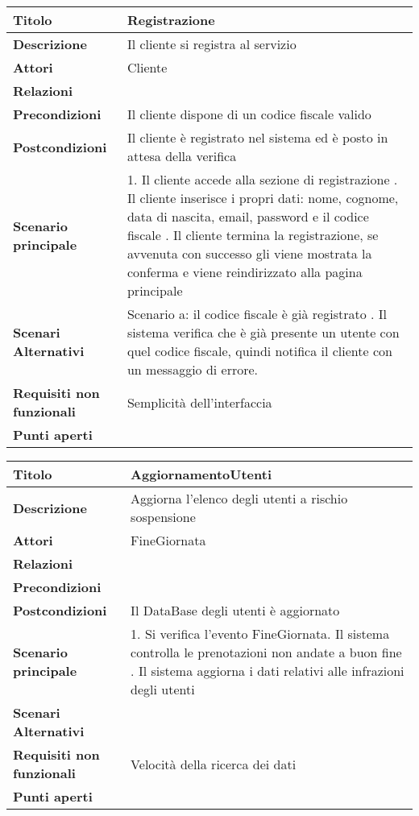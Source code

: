 \begin{tabular} {|P{4.5cm}|P{12.5cm}|}
  \hline
    \textbf{Titolo} & Registrazione\\
  \hline
    \textbf{Descrizione} & Il cliente si registra al servizio\\
  \hline
    \textbf{Attori} & Cliente\\
  \hline
    \textbf{Relazioni} &\\
  \hline
  \textbf{Precondizioni} & Il cliente dispone di un codice fiscale valido\\
  \hline
    \textbf{Postcondizioni} & Il cliente è registrato nel sistema ed è posto in attesa della verifica\\
  \hline
    \textbf{Scenario principale} & 1. Il cliente accede alla sezione di
    registrazione . Il cliente inserisce i propri dati: nome,
    cognome, data di nascita, email, password e il codice fiscale . Il
    cliente termina la registrazione, se avvenuta con successo gli viene
    mostrata la conferma e viene reindirizzato alla pagina principale\\
  \hline
    \textbf{Scenari Alternativi} & Scenario a: il codice fiscale è già
    registrato . Il sistema verifica che è già presente un utente
    con quel codice fiscale, quindi notifica il cliente con un messaggio di
    errore.\\
  \hline
    \textbf{Requisiti non funzionali} & Semplicità dell'interfaccia\\
  \hline
    \textbf{Punti aperti} &\\
  \hline
\end{tabular}
\hfill
\break

\begin{tabular} {|P{4.5cm}|P{12.5cm}|}
\hline
  \textbf{Titolo} & AggiornamentoUtenti\\
\hline
  \textbf{Descrizione} & Aggiorna l'elenco degli utenti a rischio sospensione\\
\hline
  \textbf{Attori} & FineGiornata\\
\hline
  \textbf{Relazioni} &\\
\hline
  \textbf{Precondizioni} &\\
\hline
  \textbf{Postcondizioni} & Il DataBase degli utenti è aggiornato\\
\hline
  \textbf{Scenario principale} & 1. Si verifica l'evento FineGiornata. Il sistema controlla le prenotazioni non andate a buon fine . Il
  sistema aggiorna i dati relativi alle infrazioni degli utenti\\
\hline
  \textbf{Scenari Alternativi} &\\
\hline
  \textbf{Requisiti non funzionali} & Velocità della ricerca dei dati\\
\hline
  \textbf{Punti aperti} &\\
\hline
\end{tabular}
\hfill
\break

